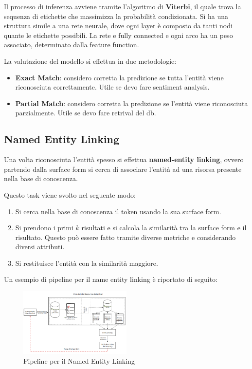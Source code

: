 Il processo di inferenza avviene tramite l'algoritmo di \textbf{Viterbi}, il quale
trova la sequenza di etichette che massimizza la probabilità condizionata. Si ha
una struttura simile a una rete neurale, dove ogni layer è composto da tanti nodi
quante le etichette possibili. La rete e fully connected e ogni arco ha un peso
associato, determinato dalla feature function.

La valutazione del modello si effettua in due metodologie:
\begin{itemize}
      \item \textbf{Exact Match}: considero corretta la predizione se tutta l'entità
            viene riconosciuta correttamente. Utile se devo fare sentiment analysis.
      \item \textbf{Partial Match}: considero corretta la predizione se l'entità
            viene riconosciuta parzialmente. Utile se devo fare retrival del db.
\end{itemize}
\subsection{Named Entity Linking}
Una volta riconosciuta l'entità spesso si effettua \textbf{named-entity linking},
ovvero partendo dalla surface form si cerca di associare l'entità ad una risorsa
presente nella base di conoscenza.

Questo task viene svolto nel seguente modo:
\begin{enumerate}
      \item Si cerca nella base di conoscenza il token usando la sua surface form.
      \item Si prendono i primi $k$ risultati e si calcola la similarità tra
            la surface form e il risultato. Questo può essere fatto tramite
            diverse metriche e considerando diversi attributi.
      \item Si restituisce l'entità con la similarità maggiore.
\end{enumerate}

Un esempio di pipeline per il name entity linking è riportato di seguito:
\begin{figure}[!ht]
      \centering
      \includegraphics[width=0.5\textwidth]{./img/nlp/nel.png}
      \caption{Pipeline per il Named Entity Linking}
      \label{fig:nel}
\end{figure}
